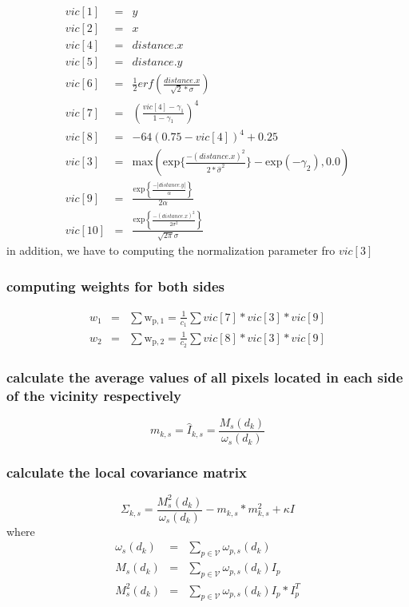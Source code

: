 \documentclass[11pt]{article}
\begin{document}
\begin{eqnarray}
vic[1] & = & y \\
vic[2] & = & x \\
vic[4] & = & distance.x \\
vic[5] & = & distance.y \\
vic[6] & = & \frac{1}{2}erf(\frac{distance.x}{\sqrt{2}*\sigma})\\
vic[7] &= & \left(\frac{vic[4] - \gamma_1}{1-\gamma_1} \right)^4\\
vic[8] &= & -64\left(0.75-vic[4]\right)^4 + 0.25\\ 
vic[3] &=& \mathrm{max}\left(
\mathrm{exp}\{\frac{-(distance.x)^2}{2*{\hat{\sigma}}^2}\} -
\mathrm{exp}(-\gamma_2), 0.0 \right)\\
vic[9] &=& \frac{\mathrm{exp}\left\{ \frac{-|distance.y|}{\alpha}
\right\}}{2\alpha}\\
vic[10] &=& \frac{\mathrm{exp} \left\{ \frac{-(distance.x)^2}{2\sigma^2} \right\}}{\sqrt{2\pi}\sigma}
\end{eqnarray}
in addition, we have to computing the normalization parameter fro $vic[3]$
\subsubsection{computing weights for both sides}
\label{sec-1_2_8}

\begin{eqnarray}
w_{1} &  =  & \sum \mathrm{w_{p,1}} = \frac{1}{c_{1}}\sum vic[7]*vic[3]*vic[9] \\
w_{2} &  =  & \sum \mathrm{w_{p,2}} = \frac{1}{c_2}\sum vic[8]*vic[3]*vic[9]
\end{eqnarray}
\subsubsection{calculate the average values of all pixels located in each side of the vicinity respectively}
\label{sec-1_2_9}

\begin{displaymath}
m_{k,s} = \hat{I}_{k,s} = \frac{M_s(d_k)}{\omega_s(d_k)}
\end{displaymath}
\subsubsection{calculate the local covariance matrix}
\label{sec-1_2_10}

\begin{displaymath}
\Sigma_{k,s} = \frac{M^2_{s}(d_k)}{\omega_{s}(d_k)} -
m_{k,s}*m_{k,s}^{2} + \kappa I
\end{displaymath}
where 
\begin{eqnarray}
\omega_s(d_k) &=& \sum_{p \in \mathcal{V}}  \omega_{p,s}(d_k)\\
M_s(d_k)  & = & \sum_{p \in \mathcal{V}} \omega_{p,s}(d_k) I_p \\
M^2_s(d_k)  & = & \sum_{p \in \mathcal{V}} \omega_{p,s}(d_k) I_p*I_{p}^T
\end{eqnarray}
\end{document}
